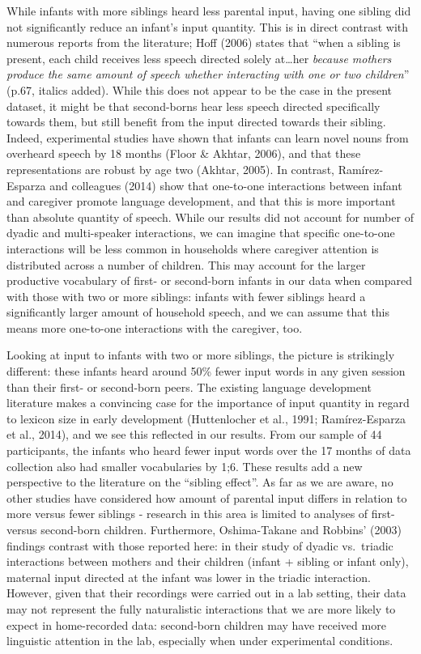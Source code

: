 \documentclass[man,floatsintext]{apa6}
\begin{document}
While infants with more siblings heard less parental input, having one sibling did not significantly reduce an infant's input quantity. This is in direct contrast with numerous reports from the literature; Hoff (2006) states that \enquote{when a sibling is present, each child receives less speech directed solely at\ldots{}her \emph{because mothers produce the same amount of speech whether interacting with one or two children}} (p.67, italics added). While this does not appear to be the case in the present dataset, it might be that second-borns hear less speech directed specifically towards them, but still benefit from the input directed towards their sibling. Indeed, experimental studies have shown that infants can learn novel nouns from overheard speech by 18 months (Floor \& Akhtar, 2006), and that these representations are robust by age two (Akhtar, 2005). In contrast, Ramírez-Esparza and colleagues (2014) show that one-to-one interactions between infant and caregiver promote language development, and that this is more important than absolute quantity of speech. While our results did not account for number of dyadic and multi-speaker interactions, we can imagine that specific one-to-one interactions will be less common in households where caregiver attention is distributed across a number of children. This may account for the larger productive vocabulary of first- or second-born infants in our data when compared with those with two or more siblings: infants with fewer siblings heard a significantly larger amount of household speech, and we can assume that this means more one-to-one interactions with the caregiver, too.

Looking at input to infants with two or more siblings, the picture is strikingly different: these infants heard around 50\% fewer input words in any given session than their first- or second-born peers. The existing language development literature makes a convincing case for the importance of input quantity in regard to lexicon size in early development (Huttenlocher et al., 1991; Ramírez-Esparza et al., 2014), and we see this reflected in our results. From our sample of 44 participants, the infants who heard fewer input words over the 17 months of data collection also had smaller vocabularies by 1;6. These results add a new perspective to the literature on the \enquote{sibling effect}. As far as we are aware, no other studies have considered how amount of parental input differs in relation to more versus fewer siblings - research in this area is limited to analyses of first- versus second-born children. Furthermore, Oshima-Takane and Robbins' (2003) findings contrast with those reported here: in their study of dyadic vs.~triadic interactions between mothers and their children (infant + sibling or infant only), maternal input directed at the infant was lower in the triadic interaction. However, given that their recordings were carried out in a lab setting, their data may not represent the fully naturalistic interactions that we are more likely to expect in home-recorded data: second-born children may have received more linguistic attention in the lab, especially when under experimental conditions.
\end{document}
